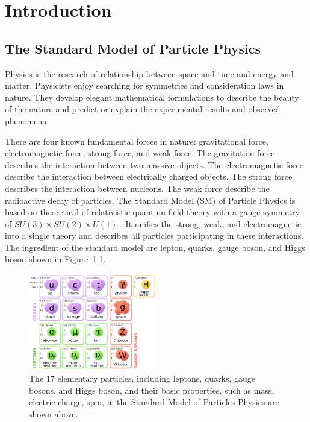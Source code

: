 \chapter{Introduction}

\section{The Standard Model of Particle Physics}

Physics is the research of relationship between space and time and energy and matter. Physicists enjoy searching for symmetries and consideration laws in nature. They develop elegant mathematical formulations to describe the beauty of the nature and predict or explain the experimental results and observed phenomena. 

There are four known fundamental forces in nature: gravitational force, electromagnetic force, strong force, and weak force. The gravitation force describes the interaction between two massive objects. The electromagnetic force describe the interaction between electrically charged objects. The strong force describes the interaction between nucleons. The weak force describe the radioactive decay of particles. The Standard Model (SM) of Particle Physics is based on theoretical of relativistic quantum field theory with a gauge symmetry of $SU(3) \times SU(2) \times U(1)$ \cite{SMTheory}. It unifies the strong, weak, and electromagnetic into a single theory and describes all particles participating in these interactions. The ingredient of the standard model are lepton, quarks, gauge boson, and Higgs boson shown in Figure~\ref{fig:SMParticle}.

\begin{figure}[hbtp]
\begin{center}
\includegraphics[width=0.50\textwidth]{Figures/Chapter1/SMParticles.png}
\caption{The 17 elementary particles, including leptons, quarks, gauge bosons, and Higgs boson, and their basic properties, such as mass, electric charge, spin, in the Standard Model of Particles Physics are shown above.}
\label{fig:SMParticle}
\end{center}
\end{figure} 


